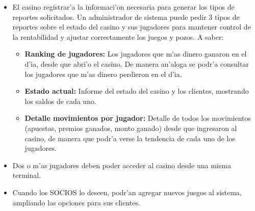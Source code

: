 \begin{itemize}
\item {} 
 
    El casino registrar'a la informaci'on necesaria para generar los tipos de reportes solicitados.
    Un administrador de sistema puede pedir 3 tipos de reportes sobre el estado del casino y sus jugadores para mantener control de la rentabilidad y ajustar correctamente los juegos y pozos. A saber:
    \begin{itemize}
        \item {\bf Ranking de jugadores:} Los jugadores que m'as dinero ganaron en el d'ia, desde que abri'o el casino. De manera an'aloga se podr'a consultar los jugadores que m'as dinero perdieron en el d'ia.
        
        \item {\bf Estado actual:} Informe del estado del casino y los clientes, mostrando los saldos de cada uno.
        
        \item {\bf Detalle movimientos por jugador:} Detalle de todos los movimientos (apuestas, premios ganados, monto ganado) desde que ingresaron al casino, de manera que podr'a verse la tendencia de cada uno de los jugadores.
    \end{itemize}

\item {} 

    Dos o m'as jugadores deben poder acceder al casino desde una misma terminal.

\item {} 

    Cuando los SOCIOS lo deseen, podr'an agregar nuevos juegos al sistema, ampliando las opciones para sus clientes.

\end{itemize}



